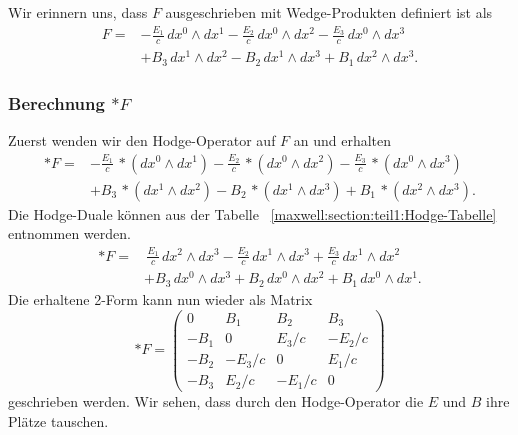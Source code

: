 Wir erinnern uns, dass $F$ ausgeschrieben mit Wedge-Produkten definiert ist als
\begin{align*}
	F = 
	& - \frac{E_{1}}{c} \, dx^0 \wedge dx^1 - \frac{E_{2}}{c} \, dx^0 \wedge dx^2 - \frac{E_{3}}{c} \, dx^0 \wedge dx^3 \\
	& + B_3 \, dx^1 \wedge dx^2 - B_2 \, dx^1 \wedge dx^3 + B_1 \, dx^2 \wedge dx^3.
\end{align*}
\subsubsection{Berechnung $\ast F$}
Zuerst wenden wir den Hodge-Operator auf $F$ an und erhalten
\begin{align*}
	\ast F =
	& - \frac{E_{1}}{c} \, {\ast}(dx^0 \wedge dx^1) - \frac{E_{2}}{c} \, {\ast}(dx^0 \wedge dx^2) - \frac{E_{3}}{c} \, {\ast}(dx^0 \wedge dx^3) \\
	& + B_3 \, {\ast}(dx^1 \wedge dx^2) - B_2 \, {\ast}(dx^1 \wedge dx^3) + B_1 \, {\ast}(dx^2 \wedge dx^3).
\end{align*}
Die Hodge-Duale können aus der Tabelle ~\ref{maxwell:section:teil1:Hodge-Tabelle} entnommen werden.
\begin{align*}
	\ast F =
	& \, \frac{E_{1}}{c} \, dx^2 \wedge dx^3 - \frac{E_{2}}{c} \, dx^1 \wedge dx^3 + \frac{E_{3}}{c} \, dx^1 \wedge dx^2 \\
	& + B_3 \, dx^0 \wedge dx^3 + B_2 \, dx^0 \wedge dx^2 + B_1 \, dx^0 \wedge dx^1.
\end{align*}
Die erhaltene 2-Form kann nun wieder als Matrix
\begin{equation}
	\ast F = \begin{pmatrix}
		0 & B_1 & B_2 & B_3 \\ -B_1 & 0 & E_3/c & -E_2/c \\ -B_2 & -E_3/c & 0 & E_1/c \\ -B_3 & E_2/c & -E_1/c & 0 
	\end{pmatrix}
\end{equation}
geschrieben werden.
Wir sehen, dass durch den Hodge-Operator die $E$ und $B$ ihre Plätze tauschen.
